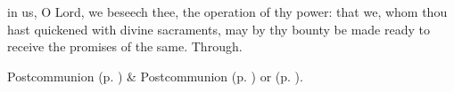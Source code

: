 \vspace{-0.25\baselineskip}

\postcommunion\label{EpiphanyIIPostcommunion}

\vspace{-0.1\baselineskip}

 in us, O Lord, we beseech thee, the operation of thy power: that we, whom thou hast quickened with divine sacraments, may by thy bounty be made ready to receive the promises of the same. Through.
\begin{rubric}
     Postcommunion  (p. \pageref{SPMaryPostChristmas}) \&  Postcommunion   (p. \pageref{SPAgainst}) or  (p. \pageref{SPChiefBishop}).
\end{rubric}


\clearpage
{}\label{epiphany}


